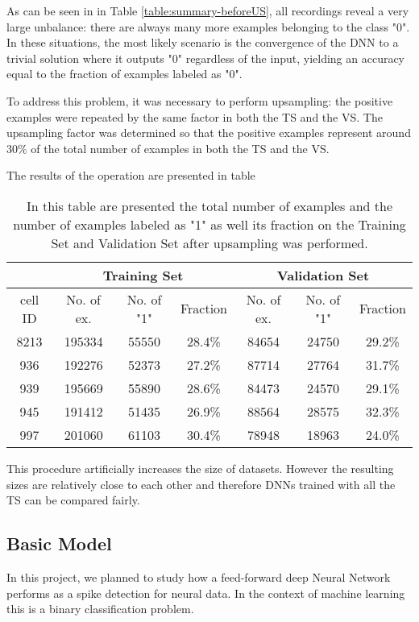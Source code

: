 As can be seen in in Table \ref{table:summary-beforeUS}, all recordings reveal a very large unbalance: there are always many more examples belonging to the class "0". In these situations, the most likely scenario is the convergence of the DNN to a trivial solution where it outputs "0" regardless of the input, yielding an accuracy equal to the fraction of examples labeled as "0".

To address this problem, it was necessary to perform upsampling: the positive examples were repeated by the same factor in both the TS and the VS. The upsampling factor was determined so that the positive examples represent around 30\% of the total number of examples in both the TS and the VS.

The results of the operation are presented in table 

\begin{table}[htbp]
\begin{center}
\begin{tabular}{c|ccc|ccc}
\multicolumn{1}{l|}{} & \multicolumn{ 3}{c|}{Training Set} & \multicolumn{ 3}{c}{Validation Set} \\ \hline
cell ID & No. of ex. & No. of "1" & Fraction & No. of ex. & No. of "1" & Fraction  \\ \hline
8213 & 195334 & 55550 & 28.4\% & 84654 & 24750 & 29.2\% \\ 
936 & 192276 & 52373 & 27.2\% & 87714 & 27764 & 31.7\% \\ 
939 & 195669 & 55890 & 28.6\% & 84473 & 24570 & 29.1\% \\ 
945 & 191412 & 51435 & 26.9\% & 88564 & 28575 & 32.3\% \\ 
997 & 201060 & 61103 & 30.4\% & 78948 & 18963 & 24.0\% \\ 
\end{tabular}
\end{center}
\caption{In this table are presented the total number of examples and the number of examples labeled as "1" as well its fraction on the Training Set and Validation Set after upsampling was performed. }
\label{table:summary-afterUS}
\end{table}

This procedure artificially increases the size of datasets. However the resulting sizes are relatively close to each other and therefore DNNs trained with all the TS can be compared fairly.

\subsection{Basic Model}
In this project, we planned to study how a  feed-forward deep Neural Network performs as a spike detection for neural data. In the context of machine learning this is a binary classification problem.

